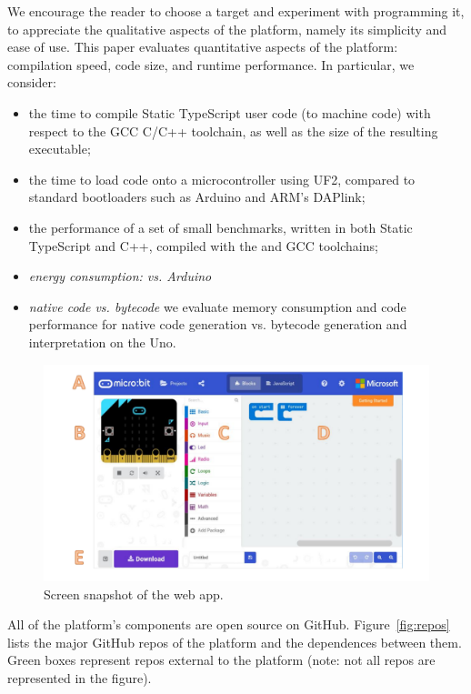 We encourage the reader to choose a target
and experiment with programming it, to appreciate the 
qualitative aspects of the platform, namely its simplicity and ease of use.  
This paper evaluates quantitative aspects of the platform: 
compilation speed, code size, and runtime performance.  In particular, we 
consider:
\begin{itemize}
\item the time to compile Static TypeScript user code (to machine code) with respect 
      to the GCC C/C++ toolchain, as well as the size of the resulting executable;
\item the time to load code onto a microcontroller using UF2, compared to standard bootloaders
      such as Arduino and ARM's DAPlink; 
\item the performance of a set of small benchmarks, written in both Static TypeScript and C++,
      compiled with the \MC and GCC toolchains;
\item \emph{energy consumption: \CO vs. Arduino}
\item \emph{native code vs. bytecode} we
      evaluate memory consumption and code performance for native code generation 
      vs. bytecode generation and interpretation on the Uno.
\end{itemize}


\begin{figure}[t]
      \includegraphics[width=5in]{screenSnapFig.pdf}
  \caption{\label{fig:screenSnap}Screen snapshot of the \MC web app.}
\end{figure}

All of the platform's components are open source on GitHub.
Figure~\ref{fig:repos} lists the major GitHub repos of the platform
and the dependences between them. Green boxes represent repos external to the platform
(note: not all repos are represented in the figure).

